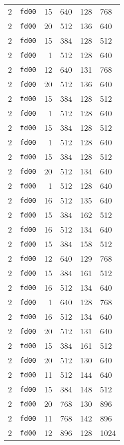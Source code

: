 \documentclass{article}
\begin{document}
\begin{table}[h!]
\begin{tabular}{llrrrl}
    2 & \texttt{fd00} & 15 & 640 & 128 & 768 \\
    2 & \texttt{fd00} & 20 & 512 & 136 & 640 \\
    2 & \texttt{fd00} & 15 & 384 & 128 & 512 \\
    2 & \texttt{fd00} & 1 & 512 & 128 & 640 \\
    2 & \texttt{fd00} & 12 & 640 & 131 & 768 \\
    2 & \texttt{fd00} & 20 & 512 & 136 & 640 \\
    2 & \texttt{fd00} & 15 & 384 & 128 & 512 \\
    2 & \texttt{fd00} & 1 & 512 & 128 & 640 \\
    2 & \texttt{fd00} & 15 & 384 & 128 & 512 \\
    2 & \texttt{fd00} & 1 & 512 & 128 & 640 \\
    2 & \texttt{fd00} & 15 & 384 & 128 & 512 \\
    2 & \texttt{fd00} & 20 & 512 & 134 & 640 \\
    2 & \texttt{fd00} & 1 & 512 & 128 & 640 \\
    2 & \texttt{fd00} & 16 & 512 & 135 & 640 \\
    2 & \texttt{fd00} & 15 & 384 & 162 & 512 \\
    2 & \texttt{fd00} & 16 & 512 & 134 & 640 \\
    2 & \texttt{fd00} & 15 & 384 & 158 & 512 \\
    2 & \texttt{fd00} & 12 & 640 & 129 & 768 \\
    2 & \texttt{fd00} & 15 & 384 & 161 & 512 \\
    2 & \texttt{fd00} & 16 & 512 & 134 & 640 \\
    2 & \texttt{fd00} & 1 & 640 & 128 & 768 \\
    2 & \texttt{fd00} & 16 & 512 & 134 & 640 \\
    2 & \texttt{fd00} & 20 & 512 & 131 & 640 \\
    2 & \texttt{fd00} & 15 & 384 & 161 & 512 \\
    2 & \texttt{fd00} & 20 & 512 & 130 & 640 \\
    2 & \texttt{fd00} & 11 & 512 & 144 & 640 \\
    2 & \texttt{fd00} & 15 & 384 & 148 & 512 \\
    2 & \texttt{fd00} & 20 & 768 & 130 & 896 \\
    2 & \texttt{fd00} & 11 & 768 & 142 & 896 \\
    2 & \texttt{fd00} & 12 & 896 & 128 & 1024 \\

\end{tabular}
\end{table}
\end{document}
